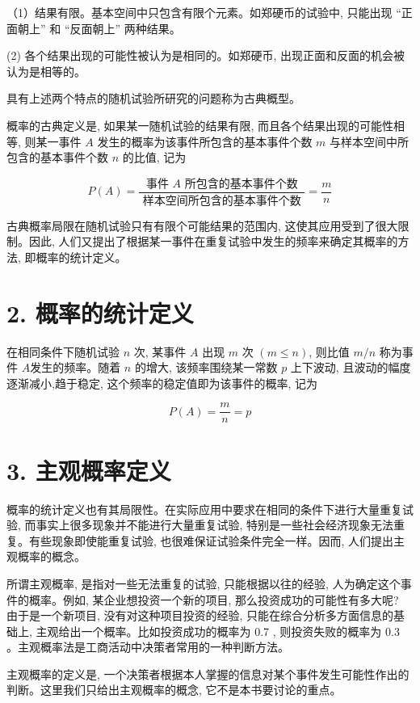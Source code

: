 \documentclass[10pt]{article}
\begin{document}
\begin{CJK*}{UTF8}{bsmi}
（1）结果有限。基本空间中只包含有限个元素。如郑硬币的试验中, 只能出现 “正面朝上” 和 “反面朝上” 两种结果。

(2) 各个结果出现的可能性被认为是相同的。如郑硬币, 出现正面和反面的机会被认为是相等的。

具有上述两个特点的随机试验所研究的问题称为古典概型。

概率的古典定义是, 如果某一随机试验的结果有限, 而且各个结果出现的可能性相等, 则某一事件 $A$ 发生的概率为该事件所包含的基本事件个数 $m$ 与样本空间中所包含的基本事件个数 $n$ 的比值, 记为


\begin{equation*}
P(A)=\frac{\text { 事件 } A \text { 所包含的基本事件个数 }}{\text { 样本空间所包含的基本事件个数 }}=\frac{m}{n} \tag{5.1}
\end{equation*}


古典概率局限在随机试验只有有限个可能结果的范围内, 这使其应用受到了很大限制。因此, 人们又提出了根据某一事件在重复试验中发生的频率来确定其概率的方法, 即概率的统计定义。

\section*{2. 概率的统计定义}
在相同条件下随机试验 $n$ 次, 某事件 $A$ 出现 $m$ 次 $(m \leqslant n)$, 则比值 $m / n$ 称为事件 $A$发生的频率。随着 $n$ 的增大, 该频率围绕某一常数 $p$ 上下波动, 且波动的幅度逐渐减小,趋于稳定, 这个频率的稳定值即为该事件的概率, 记为


\begin{equation*}
P(A)=\frac{m}{n}=p \tag{5.2}
\end{equation*}


\section*{3. 主观概率定义}
概率的统计定义也有其局限性。在实际应用中要求在相同的条件下进行大量重复试验, 而事实上很多现象并不能进行大量重复试验, 特别是一些社会经济现象无法重复。有些现象即使能重复试验, 也很难保证试验条件完全一样。因而, 人们提出主观概率的概念。

所谓主观概率, 是指对一些无法重复的试验, 只能根据以往的经验, 人为确定这个事件的概率。例如, 某企业想投资一个新的项目, 那么投资成功的可能性有多大呢? 由于是一个新项目, 没有对这种项目投资的经验, 只能在综合分析多方面信息的基础上, 主观给出一个概率。比如投资成功的概率为 0.7 , 则投资失败的概率为 0.3 。主观概率法是工商活动中决策者常用的一种判断方法。

主观概率的定义是, 一个决策者根据本人掌握的信息对某个事件发生可能性作出的判断。这里我们只给出主观概率的概念, 它不是本书要讨论的重点。


\end{CJK*}
\end{document}
